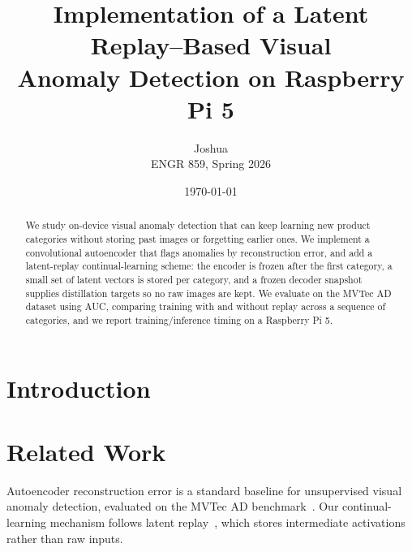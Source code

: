\documentclass[11pt]{article}
\title{\textbf{Implementation of a Latent Replay--Based Visual\\
Anomaly Detection on Raspberry Pi 5}}
\author{Joshua \\ ENGR 859, Spring 2026}
\date{\today}
\begin{document}
\maketitle

\begin{abstract}
%
We study on-device visual anomaly detection that can keep learning new product
categories without storing past images or forgetting earlier ones. We implement
a convolutional autoencoder that flags anomalies by reconstruction error, and add
a latent-replay continual-learning scheme: the encoder is frozen after the first
category, a small set of latent vectors is stored per category, and a frozen
decoder snapshot supplies distillation targets so no raw images are kept. We
evaluate on the MVTec AD dataset using AUC, comparing training with and without
replay across a sequence of categories, and we report training/inference timing
on a Raspberry Pi 5. %
\end{abstract}

\section{Introduction}




\section{Related Work}
Autoencoder reconstruction error is a standard baseline for unsupervised visual
anomaly detection, evaluated on the MVTec AD benchmark~\cite{bergmann2019mvtec}.
Our continual-learning mechanism follows latent replay~\cite{pellegrini2020latent},
which stores intermediate activations rather than raw inputs.
\end{document}
